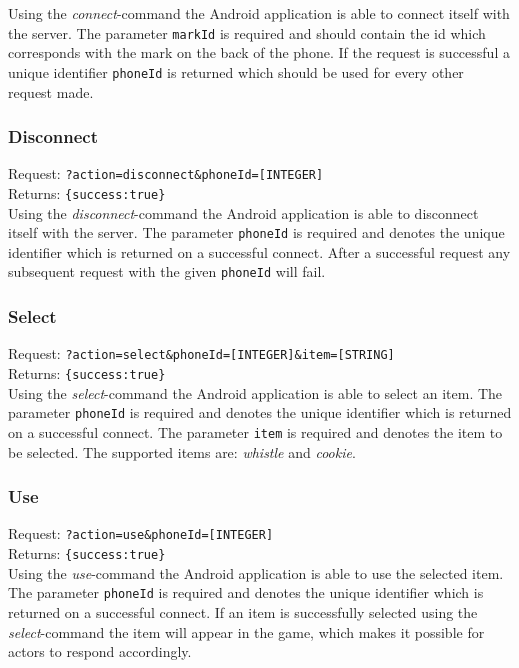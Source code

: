 \documentclass[a4paper,10pt]{article}
\begin{document}
	\noindent Using the \emph{connect}-command the Android application is able to connect itself with the server.
	The parameter \texttt{markId} is required and should contain the id which corresponds with the mark on the back of the phone.
	If the request is successful a unique identifier \texttt{phoneId} is returned which should be used for every other request made.

	\subsubsection{Disconnect}
	Request: \texttt{?action=disconnect\&phoneId=[INTEGER]} \\
	Returns: \texttt{\{success:true\}} \\

	\noindent Using the \emph{disconnect}-command the Android application is able to disconnect itself with the server.
	The parameter \texttt{phoneId} is required and denotes the unique identifier which is returned on a successful connect.
	After a successful request any subsequent request with the given \texttt{phoneId} will fail.

	\subsubsection{Select}
	Request: \texttt{?action=select\&phoneId=[INTEGER]\&item=[STRING]} \\
	Returns: \texttt{\{success:true\}} \\

	\noindent Using the \emph{select}-command the Android application is able to select an item.
	The parameter \texttt{phoneId} is required and denotes the unique identifier which is returned on a successful connect.
	The parameter \texttt{item} is required and denotes the item to be selected. The supported items are: \emph{whistle} and \emph{cookie}.

	\subsubsection{Use}
	Request: \texttt{?action=use\&phoneId=[INTEGER]} \\
	Returns: \texttt{\{success:true\}} \\

	\noindent Using the \emph{use}-command the Android application is able to use the selected item.
	The parameter \texttt{phoneId} is required and denotes the unique identifier which is returned on a successful connect.
	If an item is successfully selected using the \emph{select}-command the item will appear in the game, which makes it possible for actors to respond accordingly.



\end{document}
